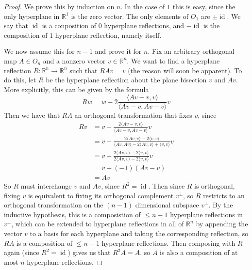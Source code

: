 \documentclass{article}
\newcommand{\R}{\mathbb{R}}
\DeclareMathOperator{\id}{id}
\begin{document}
\begin{proof}
We prove this by induction on $n$. In the case of $1$ this is easy, since the only hyperplane in $\R^1$ is the zero vector. The only elements of $O_1$ are $\pm \id$. We say that $\id$ is a conposition of $0$ hyperplane reflections, and $-\id$ is the composition of $1$ hyperplane reflection, namely itself.

We now assume this for $n-1$ and prove it for $n$. Fix an arbitrary orthogonal map $A \in O_n$ and a nonzero vector $v \in \R^n$. We want to find a hyperplane reflection $R : \R^n \to \R^n$ such that $RAv = v$ (the reason will soon be apparent). To do this, let $R$ be the hyperplane reflection about the plane bisection $v$ and $Av$. More explicitly, this can be given by the formula
$$Rw = w - 2\frac{\langle Av - v, v \rangle}{\langle Av -v, Av - v\rangle}v$$
Then we have that $RA$ an orthogonal transformation that fixes $v$, since 
\begin{align*}
Rv &= v - \frac{2 \langle Av - v, v \rangle}{\langle Av -v, Av -v \rangle} v \\
&= v - \frac{2\langle Av, v \rangle - 2\langle v, v \rangle}{\langle Av, Av \rangle - 2\langle Av, v \rangle + \langle v,v \rangle}v \\
&= v - \frac{2\langle Av,v \rangle - 2 \langle v,v \rangle}{2 \langle Av,v \rangle - 2 \langle v,v \rangle}v \\
&= v - (-1)(Av -v) \\
&= Av
\end{align*}
So $R$ must  interchange $v$ and $Av$, since $R^2 = \id$. Then since $R$ is orthogonal, fixing $v$ is equivalent to fixing its orthogonal complement $v^\perp$, so $R$ restricts to an orthogonal transformation on the $(n-1)$ dimensional subspace $v^\perp$. By the inductive hypothesis, this is a composistion of $\leq n-1$ hyperplane reflections in $v^\perp$, which can be extended to hyperplane reflections in all of $\R^n$ by appending the vector $v$ to a basis for each hyperplane and taking the corresponding reflection, so $RA$ is a composition of $\leq n-1$ hyperplane reflections. Then composing with $R$ again (since $R^2 = \id$) gives us that $R^2A = A$, so $A$ is also a composition of at most $n$ hyperplane reflections.
\end{proof}
\end{document}
